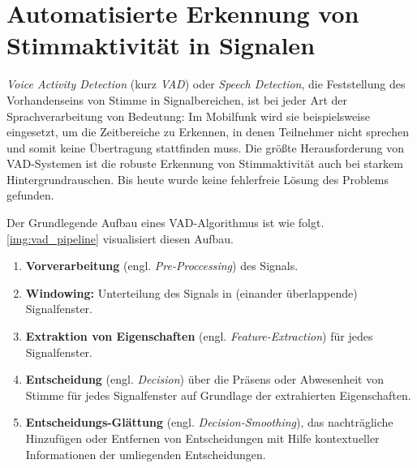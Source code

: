 \section{Automatisierte Erkennung von Stimmaktivität in Signalen}
\label{sec:vad_new}

\emph{Voice Activity Detection} (kurz \emph{VAD}) oder \emph{Speech Detection}, die Feststellung des Vorhandenseins von Stimme in Signalbereichen, ist bei jeder Art der Sprachverarbeitung von Bedeutung: Im Mobilfunk wird sie beispielsweise eingesetzt, um die Zeitbereiche zu Erkennen, in denen Teilnehmer nicht sprechen und somit keine Übertragung stattfinden muss. Die größte Herausforderung von VAD-Systemen ist die robuste Erkennung von Stimmaktivität auch bei starkem Hintergrundrauschen. Bis heute wurde keine fehlerfreie Lösung des Problems gefunden. \cite[S. 1]{vad_granada} \cite[S. 1]{vad_kola} \cite[S. 1]{vad_Lisboa}

Der Grundlegende Aufbau eines VAD-Algorithmus ist wie folgt. \autoref{img:vad_pipeline} visualisiert diesen Aufbau.
\begin{enumerate}
	\item \textbf{Vorverarbeitung} (engl. \emph{Pre-Proccessing}) des Signals.
	\item \textbf{Windowing: } Unterteilung des Signals in (einander überlappende) Signalfenster.
	\item \textbf{Extraktion von Eigenschaften} (engl. \emph{Feature-Extraction}) für jedes Signalfenster.
	\item \textbf{Entscheidung} (engl. \emph{Decision}) über die Präsens oder Abwesenheit von Stimme für jedes Signalfenster auf Grundlage der extrahierten Eigenschaften.
	\item \textbf{Entscheidungs-Glättung} (engl. \emph{Decision-Smoothing}), das nachträgliche Hinzufügen oder Entfernen von Entscheidungen mit Hilfe kontextueller Informationen der umliegenden Entscheidungen.\cite[S. 8 - 9]{vad_granada} \cite[S. 1 - 2]{vad_kola}
\end{enumerate}

